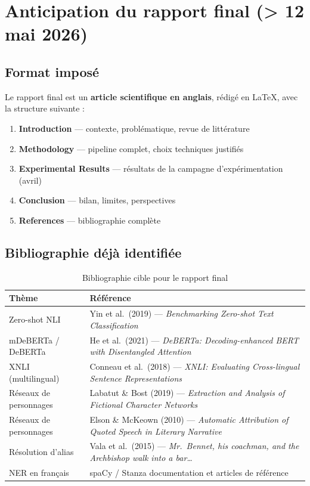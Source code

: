 \documentclass[a4paper,11pt]{article}
\begin{document}
\section{Anticipation du rapport final (> 12 mai 2026)}

\subsection{Format imposé}

Le rapport final est un \textbf{article scientifique en anglais}, rédigé en \LaTeX{}, avec la
structure suivante :

\begin{enumerate}[noitemsep]
  \item \textbf{Introduction} --- contexte, problématique, revue de littérature
  \item \textbf{Methodology} --- pipeline complet, choix techniques justifiés
  \item \textbf{Experimental Results} --- résultats de la campagne d'expérimentation (avril)
  \item \textbf{Conclusion} --- bilan, limites, perspectives
  \item \textbf{References} --- bibliographie complète
\end{enumerate}

\subsection{Bibliographie déjà identifiée}

\begin{table}[H]
  \centering
  \footnotesize
  \begin{tabular}{lp{10cm}}
    \toprule
    \textbf{Thème} & \textbf{Référence} \\
    \midrule
    Zero-shot NLI         & Yin et al.\ (2019) --- \textit{Benchmarking Zero-shot Text Classification} \\
    mDeBERTa / DeBERTa    & He et al.\ (2021) --- \textit{DeBERTa: Decoding-enhanced BERT with Disentangled Attention} \\
    XNLI (multilingual)   & Conneau et al.\ (2018) --- \textit{XNLI: Evaluating Cross-lingual Sentence Representations} \\
    Réseaux de personnages & Labatut \& Bost (2019) --- \textit{Extraction and Analysis of Fictional Character Networks} \\
    Réseaux de personnages & Elson \& McKeown (2010) --- \textit{Automatic Attribution of Quoted Speech in Literary Narrative} \\
    Résolution d'alias    & Vala et al.\ (2015) --- \textit{Mr.\ Bennet, his coachman, and the Archbishop walk into a bar\ldots} \\
    NER en français       & spaCy / Stanza documentation et articles de référence \\
    \bottomrule
  \end{tabular}
  \caption{Bibliographie cible pour le rapport final}
\end{table}
\end{document}
